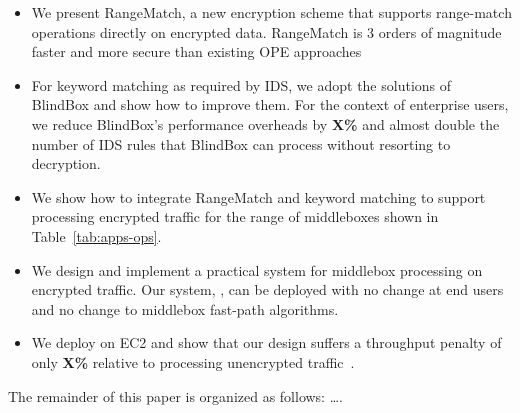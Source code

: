 \begin{itemize} [leftmargin=*] 
\vspace{-0.8em}
\item We present RangeMatch, a new encryption scheme that supports range-match operations directly on encrypted data. RangeMatch is 
3 orders of magnitude faster and more secure than existing OPE approaches
\vspace{-0.4em}
\item For keyword matching as required by IDS, we adopt the solutions of BlindBox and show how to improve them. For the context of enterprise 
users, we reduce BlindBox's performance overheads by {\bf X\%} and almost double the number of IDS rules that BlindBox can process without resorting 
to decryption. 
\vspace{-0.4em}
\item We show how to integrate RangeMatch and keyword matching to support processing encrypted traffic for the 
range of middleboxes shown in Table~\ref{tab:apps-ops}. 
\vspace{-0.4em}
\item We design and implement a practical system for middlebox processing on encrypted traffic. Our system, \sys,   
can be deployed with no change at end users and no change to middlebox fast-path algorithms. 
\vspace{-0.4em}
\item We deploy \sys on EC2 and show that our design suffers a throughput penalty of only {\bf X\%} relative to processing unencrypted 
traffic~\cite{aplomb}.  
\vspace{-0.4em}
\end{itemize} 

The remainder of this paper is organized as follows: \ldots. 
 


    
 \setcounter{theapp}{0}  
\newcommand{\capp}{\refstepcounter{theapp}\arabic{theapp}}
    
